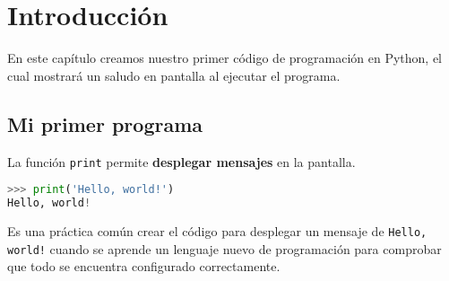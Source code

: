 \chapter{Introducción}

En este capítulo creamos nuestro primer código de programación en Python, el cual mostrará un saludo en pantalla al ejecutar el programa.

\section{Mi primer programa}

La función \lstinline|print| permite \textbf{desplegar mensajes} en la pantalla.

\begin{lstlisting}[language=Python]
>>> print('Hello, world!')
Hello, world!
\end{lstlisting}

Es una práctica común crear el código para desplegar un mensaje de \lstinline|Hello, world!| cuando se aprende un lenguaje nuevo
de programación para comprobar que todo se encuentra configurado correctamente.
